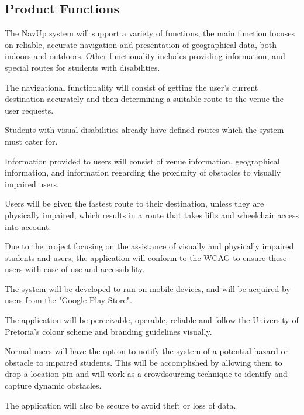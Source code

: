 	\subsection{Product Functions}
		The NavUp system will support a variety of functions, the main function focuses on reliable, accurate navigation and presentation of geographical data, both indoors and outdoors. Other functionality includes providing information, and special routes for students with disabilities.
		\\ \par\noindent
		The navigational functionality will consist of getting the user's current destination accurately and then determining a suitable route to the venue the user requests.\\ \par\noindent
		Students with visual disabilities already have defined routes which the system must cater for.\\ \par\noindent
		Information provided to users will consist of venue information, geographical information, and information regarding the proximity of obstacles to visually impaired users.\\ \par\noindent
		Users will be given the fastest route to their destination, unless they are physically impaired, which results in a route that takes lifts and wheelchair access into account.\\ \par\noindent
		Due to the project focusing on the assistance of visually and physically impaired students and users, the application will conform to the WCAG to ensure these users with ease of use and accessibility.\\ \par\noindent
		The system will be developed to run on mobile devices, and will be acquired by users from the "Google Play Store".\\ \par\noindent
		The application will be perceivable, operable, reliable and follow the University of Pretoria's colour scheme and branding guidelines visually.\\ \par\noindent
		Normal users will have the option to notify the system of a potential hazard or obstacle to impaired students. This will be accomplished by allowing them to drop a location pin and will work as a crowdsourcing technique to identify and capture dynamic obstacles. \\ \par\noindent
		The application will also be secure to avoid theft or loss of data.
			
